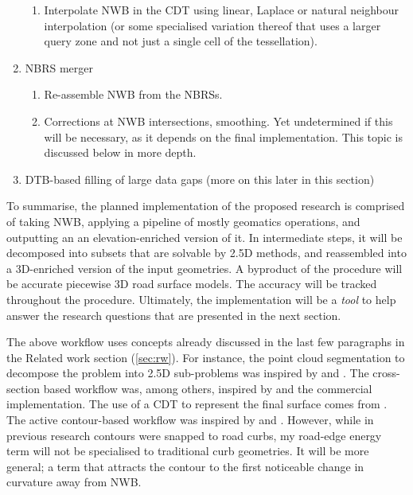 \begin{enumerate}
\begin{enumerate}
            \item Interpolate NWB in the CDT using linear, Laplace or natural neighbour interpolation (or some specialised variation thereof that uses a larger query zone and not just a single cell of the tessellation).
        \end{enumerate}
    \item NBRS merger
        \begin{enumerate}
            \item Re-assemble NWB from the NBRSs.
            \item Corrections at NWB intersections, smoothing. Yet undetermined if this will be necessary, as it depends on the final implementation. This topic is discussed below in more depth.
        \end{enumerate}
    \item DTB-based filling of large data gaps (more on this later in this section)
\end{enumerate}

To summarise, the planned implementation of the proposed research is comprised of taking NWB, applying a pipeline of mostly geomatics operations, and outputting an an elevation-enriched version of it. In intermediate steps, it will be decomposed into subsets that are solvable by 2.5D methods, and reassembled into a 3D-enriched version of the input geometries. A byproduct of the procedure will be accurate piecewise 3D road surface models. The accuracy will be tracked throughout the procedure. Ultimately, the implementation will be a \textit{tool} to help answer the research questions that are presented in the next section.

The above workflow uses concepts already discussed in the last few paragraphs in the Related work section (\ref{sec:rw}). For instance, the point cloud segmentation to decompose the problem into 2.5D sub-problems was inspired by \cite{oudeElberink_vosselman_2009} and \cite{boyko_funkhauser_2011}. The cross-section based workflow was, among others, inspired by \cite{yang_etal_2013} and the commercial implementation. The use of a CDT to represent the final surface comes from \cite{oudeElberink_vosselman_2006}. The active contour-based workflow was inspired by \cite{boyko_funkhauser_2011} and \cite{gopfert_etal_2011}. However, while in previous research contours were snapped to road curbs, my road-edge energy term will not be specialised to traditional curb geometries. It will be more general; a term that attracts the contour to the first noticeable change in curvature away from NWB.

